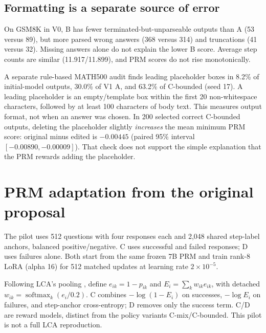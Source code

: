 \documentclass{article}
\begin{document}
\subsection{Formatting is a separate source of error}
On GSM8K in V0, B has fewer terminated-but-unparseable outputs than A (53 versus 89), but more parsed wrong answers (368 versus 314) and truncations (41 versus 32). Missing answers alone do not explain the lower B score. Average step counts are similar (11.917/11.899), and PRM scores do not rise monotonically.

A separate rule-based MATH500 audit finds leading placeholder boxes in 8.2\% of initial-model outputs, 30.0\% of V1 A, and 63.2\% of C-bounded (seed 17). A leading placeholder is an empty/template box within the first 20 non-whitespace characters, followed by at least 100 characters of body text. This measures output format, not when an answer was chosen. In 200 selected correct C-bounded outputs, deleting the placeholder slightly \emph{increases} the mean minimum PRM score: original minus edited is $-0.00445$ (paired 95\% interval $[-0.00890,-0.00009]$). That check does not support the simple explanation that the PRM rewards adding the placeholder.

\clearpage
\section{PRM adaptation from the original proposal}\label{sec:adaptation}
The pilot uses 512 questions with four responses each and 2,048 shared step-label anchors, balanced positive/negative. C uses successful and failed responses; D uses failures alone. Both start from the same frozen 7B PRM and train rank-8 LoRA (alpha 16) for 512 matched updates at learning rate $2\times10^{-5}$.

Following LCA's pooling \citep{jia2026}, define $e_{ik}=1-p_{ik}$ and $E_i=\sum_k w_{ik}e_{ik}$, with detached $w_{ik}=\operatorname{softmax}_k(e_i/0.2)$. C combines $-\log(1-E_i)$ on successes, $-\log E_i$ on failures, and step-anchor cross-entropy; D removes only the success term. C/D are reward models, distinct from the policy variants C-mix/C-bounded. This pilot is not a full LCA reproduction.
\end{document}
